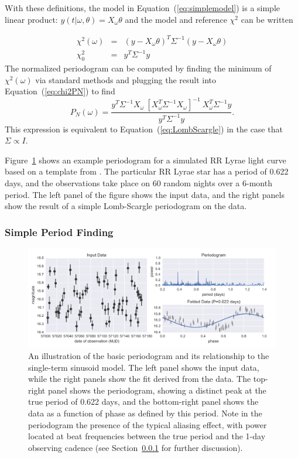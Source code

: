 \documentclass[12pt,preprint]{aastex}
\newcommand{\Fig}[1]{Figure~\ref{fig:#1}}
\newcommand{\fig}[1]{\Fig{#1}}
\newcommand{\figlabel}[1]{\label{fig:#1}}
\newcommand{\Eq}[1]{Equation~(\ref{eq:#1})}
\newcommand{\eq}[1]{\Eq{#1}}
\newcommand{\eqlabel}[1]{\label{eq:#1}}
\newcommand{\Sect}[1]{Section~\ref{sect:#1}}
\newcommand{\sect}[1]{\Sect{#1}}
\newcommand{\sectlabel}[1]{\label{sect:#1}}
\begin{document}
With these definitions, the model in \eq{simplemodel} is a simple linear product: $y(t|\omega,\theta) = X_\omega\theta$ and the model and reference $\chi^2$ can be written

\begin{eqnarray}
  \chi^2(\omega) &=& (y - X_\omega\theta)^T\Sigma^{-1}(y - X_\omega\theta)\\
  \chi^2_0 &=& y^T \Sigma^{-1} y
\end{eqnarray}
The normalized periodogram can be computed by finding the minimum of $\chi^2(\omega)$ via standard methods and plugging the result into \eq{chi2PN} to find
\begin{equation}
  \eqlabel{LombScargle2}
  P_N(\omega) = \frac{y^T\Sigma^{-1}X_\omega~[X_\omega^T\Sigma^{-1}X_\omega]^{-1}~X_\omega^T\Sigma^{-1}y}{y^T\Sigma^{-1}y}.
\end{equation}
This expression is equivalent to \eq{LombScargle} in the case that $\Sigma \propto I$.

\fig{basic_example} shows an example periodogram for a simulated RR Lyrae light curve based on a template from \citet{Sesar2010}. The particular RR Lyrae star has a period of 0.622 days, and the observations take place on 60 random nights over a 6-month period.  The left panel of the figure shows the input data, and the right panels show the result of a simple Lomb-Scargle periodogram on the data.

\subsubsection{Simple Period Finding}
\sectlabel{simple_period}

\begin{figure}
  \centering
  \includegraphics[width=\textwidth]{fig01.pdf}
  \caption{
    An illustration of the basic periodogram and its relationship to the single-term sinusoid model. The left panel shows the input data, while the right panels show the fit derived from the data. The top-right panel shows the periodogram, showing a distinct peak at the true period of 0.622 days, and the bottom-right panel shows the data as a function of phase as defined by this period. Note in the periodogram the presence of the typical aliasing effect, with power located at beat frequencies between the true period and the 1-day observing cadence (see \sect{simple_period} for further discussion).
  }
  \figlabel{basic_example}
\end{figure}
\end{document}
